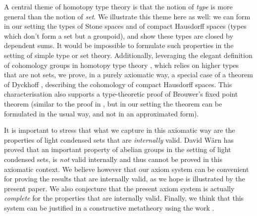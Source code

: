A central theme of homotopy type theory is that the notion of {\em type} is more general than the notion of {\em set}. We illustrate
this theme here as well: we can form in our setting the types of Stone spaces and of compact Hausdorff spaces
(types which don't form a set but a groupoid),
and show these types are
closed by dependent sums. It would be impossible to formulate such properties in the setting of simple type or set theory.
Additionally, leveraging the elegant definition of cohomology groups in homotopy type theory \cite{hott}, which relies
on higher types that are not sets, we prove, in a purely axiomatic way,
a special case of a theorem of Dyckhoff \cite{dyckhoff76}, describing
the cohomology of compact Hausdorff spaces. This characterisation also supports a type-theoretic proof of
Brouwer's fixed point theorem
(similar to the proof in \cite{shulman-Brouwer-fixed-point},  but
in our setting the theorem can be formulated in the usual
way, and not in an approximated form).

It is important to stress that what we capture in this axiomatic way are the properties of light condensed
sets that are {\em internally} valid. David W\"arn \cite{warn2024} has proved that an important property of abelian
groups in the setting of light condensed sets, is {\em not} valid internally and thus cannot be proved in this axiomatic context.
We believe however that our axiom system can be convenient for proving the results that are internally valid, as we hope
is illustrated by the present paper. We also conjecture that the present axiom system is actually {\em complete}
for the properties that are internally valid. Finally, we think that this system can be justified in a constructive metatheory
using the work \cite{CRS21}.
